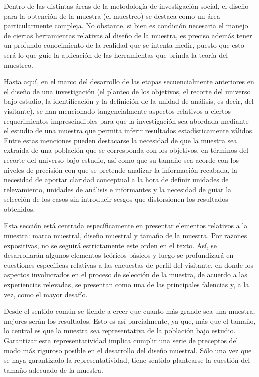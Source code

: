 \documentclass[
]{book}
\begin{document}
Dentro de las distintas áreas de la metodología de investigación social, el diseño para la obtención de la muestra (el muestreo) se destaca como un área particularmente compleja. No obstante, si bien es condición necesaria el manejo de ciertas herramientas relativas al diseño de la muestra, es preciso además tener un profundo conocimiento de la realidad que se intenta medir, puesto que esto será lo que guíe la aplicación de las herramientas que brinda la teoría del muestreo.

Hasta aquí, en el marco del desarrollo de las etapas secuencialmente anteriores en el diseño de una investigación (el planteo de los objetivos, el recorte del universo bajo estudio, la identificación y la definición de la unidad de análisis, es decir, del visitante), se han mencionado tangencialmente aspectos relativos a ciertos requerimientos imprescindibles para que la investigación sea abordada mediante el estudio de una muestra que permita inferir resultados estadísticamente válidos. Entre estas menciones pueden destacarse la necesidad de que la muestra sea extraída de una población que se corresponda con los objetivos, en términos del recorte del universo bajo estudio, así como que su tamaño sea acorde con los niveles de precisión con que se pretende analizar la información recabada, la necesidad de aportar claridad conceptual a la hora de definir unidades de relevamiento, unidades de análisis e informantes y la necesidad de guiar la selección de los casos sin introducir sesgos que distorsionen los resultados obtenidos.

Esta sección está centrada específicamente en presentar elementos relativos a la muestra: marco muestral, diseño muestral y tamaño de la muestra. Por razones expositivas, no se seguirá estrictamente este orden en el texto. Así, se desarrollarán algunos elementos teóricos básicos y luego se profundizará en cuestiones específicas relativas a las encuestas de perfil del visitante, en donde los aspectos involucrados en el proceso de selección de la muestra, de acuerdo a las experiencias relevadas, se presentan como una de las principales falencias y, a la vez, como el mayor desafío.

Desde el sentido común se tiende a creer que cuanto más grande sea una muestra, mejores serán los resultados. Esto es así parcialmente, ya que, más que el tamaño, lo central es que la muestra sea representativa de la población bajo estudio. Garantizar esta representatividad implica cumplir una serie de preceptos del modo más riguroso posible en el desarrollo del diseño muestral. Sólo una vez que se haya garantizado la representatividad, tiene sentido plantearse la cuestión del tamaño adecuado de la muestra.
\end{document}
